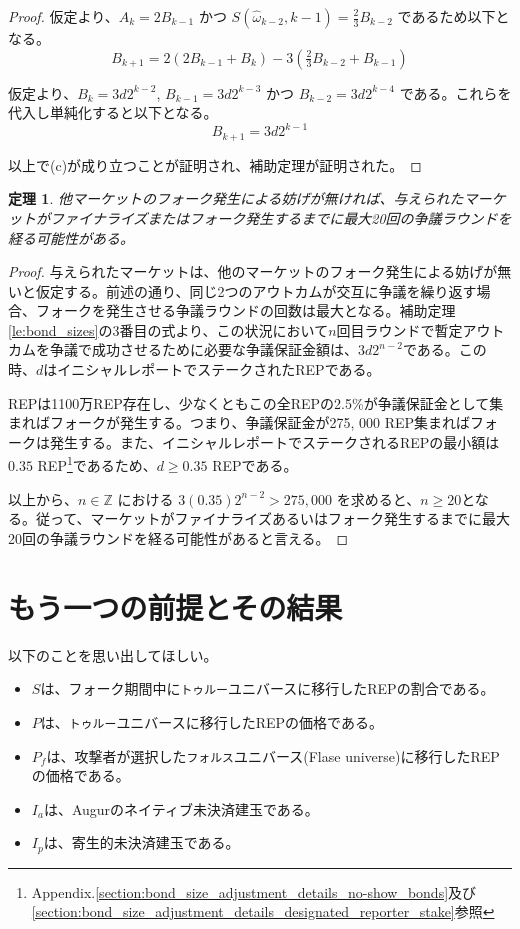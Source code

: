 \documentclass[floatfix,reprint,nofootinbib,amsmath,amssymb,epsfig,pre,floats,letterpaper,groupedaffiliation]{revtex4-1}
\newtheorem{theorem}{定理}
\theoremstyle{definition}
\theoremstyle{definition}
\theoremstyle{definition}
\begin{document}
\begin{appendix}
\begin{proof}
仮定より、$A_{k}=2B_{k-1}$ かつ $S(\hat{\omega}_{k-2},k-1)=\frac{2}{3}B_{k-2}$ であるため以下となる。
\[ B_{k+1}=2\left(2B_{k-1}+B_{k}\right)-3\left(\tfrac{2}{3}B_{k-2}+B_{k-1}\right) \]

仮定より、$B_{k}=3d2^{k-2}$, $B_{k-1}=3d2^{k-3}$ かつ $B_{k-2}=3d2^{k-4}$ である。これらを代入し単純化すると以下となる。
\[ B_{k+1}=3d2^{k-1} \]

以上で(c)が成り立つことが証明され、補助定理が証明された。
\end{proof}

\begin{theorem}\label{th:twenty_rounds}
他マーケットのフォーク発生による妨げが無ければ、与えられたマーケットがファイナライズまたはフォーク発生するまでに最大20回の争議ラウンドを経る可能性がある。
\end{theorem}

\begin{proof}

与えられたマーケットは、他のマーケットのフォーク発生による妨げが無いと仮定する。前述の通り、同じ2つのアウトカムが交互に争議を繰り返す場合、フォークを発生させる争議ラウンドの回数は最大となる。補助定理\ref{le:bond_sizes}の3番目の式より、この状況において$n$回目ラウンドで暫定アウトカムを争議で成功させるために必要な争議保証金額は、$3d2^{n-2}$である。この時、$d$はイニシャルレポートでステークされたREPである。

REPは1100万REP存在し、少なくともこの全REPの2.5\%が争議保証金として集まればフォークが発生する。つまり、争議保証金が275, 000 REP集まればフォークは発生する。また、イニシャルレポートでステークされるREPの最小額は$0.35$ REP\footnote{Appendix.\ref{section:bond_size_adjustment_details_no-show_bonds}及び\ref{section:bond_size_adjustment_details_designated_reporter_stake}参照}であるため、$d \geq 0.35$ REPである。

以上から、$n \in \mathbb{Z}$ における $3(0.35)2^{n-2}>275,000$ を求めると、$n \geq 20$となる。従って、マーケットがファイナライズあるいはフォーク発生するまでに最大20回の争議ラウンドを経る可能性があると言える。
\end{proof}

\section{もう一つの前提とその結果}\label{section:alternative_assumptions}

以下のことを思い出してほしい。
\begin{itemize}
\item{$S$は、フォーク期間中に\texttt{トゥルー}ユニバースに移行したREPの割合である。}
\item{$P$は、\texttt{トゥルー}ユニバースに移行したREPの価格である。}
\item{$P_{f}$は、攻撃者が選択した\texttt{フォルス}ユニバース(Flase universe)に移行したREPの価格である。}
\item{$I_{a}$は、Augurのネイティブ未決済建玉である。}
\item{$I_{p}$は、寄生的未決済建玉である。}
\end{itemize}


\end{appendix}
\end{document}
